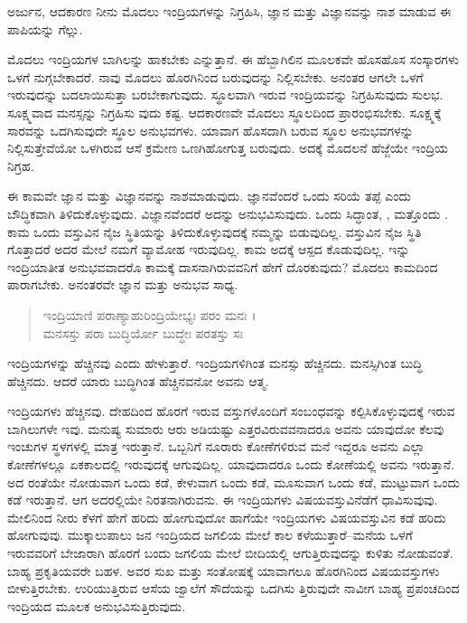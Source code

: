 {\small ಅರ್ಜುನ, ಆದಕಾರಣ ನೀನು ಮೊದಲು ಇಂದ್ರಿಯಗಳನ್ನು ನಿಗ್ರಹಿಸಿ, ಜ್ಞಾನ ಮತ್ತು ವಿಜ್ಞಾನವನ್ನು ನಾಶ ಮಾಡುವ ಈ ಪಾಪಿಯನ್ನು ಗೆಲ್ಲು.}

ಮೊದಲು ಇಂದ್ರಿಯಗಳ ಬಾಗಿಲನ್ನು ಹಾಕಬೇಕು ಎನ್ನುತ್ತಾನೆ. ಈ ಹೆಬ್ಬಾಗಿಲಿನ ಮೂಲಕವೇ ಹೊಸಹೊಸ ಸಂಸ್ಕಾರಗಳು ಒಳಗೆ ನುಗ್ಗಬೇಕಾದರೆ. ನಾವು ಮೊದಲು ಹೊರಗಿನಿಂದ ಬರುವುದನ್ನು ನಿಲ್ಲಿಸಬೇಕು. ಅನಂತರ ಆಗಲೇ ಒಳಗೆ ಇರುವುದನ್ನು ಬದಲಾಯಿಸುತ್ತಾ ಬರಬೇಕಾಗುವುದು. ಸ್ಥೂಲವಾಗಿ ಇರುವ ಇಂದ್ರಿಯವನ್ನು ನಿಗ್ರಹಿಸುವುದು ಸುಲಭ. ಸೂಕ್ಷ್ಮವಾದ ಮನಸ್ಸನ್ನು ನಿಗ್ರಹಿಸು ವುದು ಕಷ್ಟ. ಆದಕಾರಣವೇ ಮೊದಲು ಸ್ಥೂಲದಿಂದ ಪ್ರಾರಂಭಿಸಬೇಕು. ಸೂಕ್ಷ್ಮಕ್ಕೆ ಸಾರವನ್ನು ಒದಗಿಸುವುದೇ ಸ್ಥೂಲ ಅನುಭವಗಳು. ಯಾವಾಗ ಹೊಸದಾಗಿ ಬರುವ ಸ್ಥೂಲ ಅನುಭವಗಳನ್ನು ನಿಲ್ಲಿಸುತ್ತೇವೆಯೋ ಒಳಗಿರುವ ಆಸೆ ಕ್ರಮೇಣ ಒಣಗಿಹೋಗುತ್ತ ಬರುವುದು. ಅದಕ್ಕೆ ಮೊದಲನೆ ಹೆಜ್ಜೆಯೇ ಇಂದ್ರಿಯ ನಿಗ್ರಹ.

ಈ ಕಾಮವೇ ಜ್ಞಾನ ಮತ್ತು ವಿಜ್ಞಾನವನ್ನು ನಾಶಮಾಡುವುದು. ಜ್ಞಾನವೆಂದರೆ ಒಂದು ಸರಿಯೆ ತಪ್ಪೆ ಎಂದು ಬೌದ್ಧಿಕವಾಗಿ ತಿಳಿದುಕೊಳ್ಳುವುದು. ವಿಜ್ಞಾನವೆಂದರೆ ಅದನ್ನು ಅನುಭವಿಸುವುದು. ಒಂದು ಸಿದ್ಧಾಂತ, , ಮತ್ತೊಂದು . ಕಾಮ ಒಂದು ವಸ್ತುವಿನ ನೈಜ ಸ್ಥಿತಿಯನ್ನು ತಿಳಿದುಕೊಳ್ಳುವುದಕ್ಕೆ ನಮ್ಮನ್ನು ಬಿಡುವುದಿಲ್ಲ. ವಸ್ತುವಿನ ನೈಜ ಸ್ಥಿತಿ ಗೊತ್ತಾದರೆ ಅದರ ಮೇಲೆ ನಮಗೆ ವ್ಯಾಮೋಹ ಇರುವುದಿಲ್ಲ. ಕಾಮ ಅದಕ್ಕೆ ಆಸ್ಪದ ಕೊಡುವುದಿಲ್ಲ. ಇನ್ನು ಇಂದ್ರಿಯಾತೀತ ಅನುಭವವಾದರೊ ಕಾಮಕ್ಕೆ ದಾಸನಾಗಿರುವವನಿಗೆ ಹೇಗೆ ದೊರಕುವುದು? ಮೊದಲು ಕಾಮದಿಂದ ಪಾರಾಗಬೇಕು. ಅನಂತರವೇ ಜ್ಞಾನ ಮತ್ತು ಅನುಭವ ಸಾಧ್ಯ.

\begin{verse}
ಇಂದ್ರಿಯಾಣಿ ಪರಾಣ್ಯಾಹುರಿಂದ್ರಿಯೇಭ್ಯಃ ಪರಂ ಮನಃ ।\\ಮನಸಸ್ತು ಪರಾ ಬುದ್ಧಿರ್ಯೋ ಬುದ್ಧೇಃ ಪರತಸ್ತು ಸಃ 
\end{verse}

{\small ಇಂದ್ರಿಯಗಳನ್ನು ಹೆಚ್ಚಿನವು ಎಂದು ಹೇಳುತ್ತಾರೆ. ಇಂದ್ರಿಯಗಳಿಗಿಂತ ಮನಸ್ಸು ಹೆಚ್ಚಿನದು. ಮನಸ್ಸಿಗಿಂತ ಬುದ್ಧಿ ಹೆಚ್ಚಿನದು. ಆದರೆ ಯಾರು ಬುದ್ಧಿಗಿಂತ ಹೆಚ್ಚಿನವನೋ ಅವನು ಆತ್ಮ.}

ಇಂದ್ರಿಯಗಳು ಹೆಚ್ಚಿನವು. ದೇಹದಿಂದ ಹೊರಗೆ ಇರುವ ವಸ್ತುಗಳೊಂದಿಗೆ ಸಂಬಂಧವನ್ನು ಕಲ್ಪಿಸಿಕೊಳ್ಳುವುದಕ್ಕೆ ಇರುವ ಬಾಗಿಲುಗಳೇ ಇವು. ಮನುಷ್ಯ ಸುಮಾರು ಆರು ಅಡಿಯಷ್ಟು ಎತ್ತರವಿರುವವನಾದರೂ ಅವನು ಯಾವುದೋ ಕೆಲವು ಇಂಚುಗಳ ಸ್ಥಳಗಳಲ್ಲಿ ಮಾತ್ರ ಇರುತ್ತಾನೆ. ಒಬ್ಬನಿಗೆ ನೂರಾರು ಕೋಣೆಗಳಿರುವ ಮನೆ ಇದ್ದರೂ ಅವನು ಎಲ್ಲಾ ಕೋಣೆಗಳಲ್ಲೂ ಏಕಕಾಲದಲ್ಲಿ ಇರುವುದಕ್ಕೆ ಆಗುವುದಿಲ್ಲ. ಯಾವುದಾದರೂ ಒಂದು ಕೋಣೆಯಲ್ಲಿ ಅವನು ಇರುತ್ತಾನೆ. ಅದ ರಂತೆಯೇ ನೋಡುವಾಗ ಒಂದು ಕಡೆ, ಕೇಳುವಾಗ ಒಂದು ಕಡೆ, ಮೂಸುವಾಗ ಒಂದು ಕಡೆ, ಮುಟ್ಟುವಾಗ ಒಂದು ಕಡೆ ಇರುತ್ತಾನೆ. ಆಗ ಅದರಲ್ಲಿಯೇ ನಿರತನಾಗಿರುವನು. ಈ ಇಂದ್ರಿಯಗಳು ವಿಷಯವಸ್ತುವಿನೆಡೆಗೆ ಧಾವಿಸುವುವು. ಮೇಲಿನಿಂದ ನೀರು ಕೆಳಗೆ ಹೇಗೆ ಹರಿದು ಹೋಗುವುದೋ ಹಾಗೆಯೇ ಇಂದ್ರಿಯಗಳು ವಿಷಯವಸ್ತುವಿನ ಕಡೆ ಹರಿದು ಹೋಗುವುವು. ಮುಕ್ಕಾಲುಪಾಲು ಜನ ಇಂದ್ರಿಯದ ಜಗಲಿಯ ಮೇಲೆ ಕಾಲ ಕಳೆಯುತ್ತಾರೆ–ಮನೆಯ ಒಳಗೆ ಇರುವವರಿಗೆ ಬೇಜಾರಾಗಿ ಹೊರಗೆ ಬಂದು ಜಗಲಿಯ ಮೇಲೆ ಬೀದಿಯಲ್ಲಿ ಆಗುತ್ತಿರುವುದನ್ನು ಕುಳಿತು ನೋಡುವಂತೆ. ಬಾಹ್ಯ ಪ್ರಕೃತಿಯವರೇ ಬಹಳ. ಅವರ ಸುಖ ಮತ್ತು ಸಂತೋಷಕ್ಕೆ ಯಾವಾಗಲೂ ಹೊರಗಿನಿಂದ ವಿಷಯವಸ್ತುಗಳು ಬೀಳುತ್ತಿರಬೇಕು. ಉರಿಯುತ್ತಿರುವ ಆಸೆಯ ಜ್ವಾಲೆಗೆ ಸೌದೆಯನ್ನು ಒದಗಿಸು ತ್ತಿರುವುದೇ ನಾವೀಗ ಬಾಹ್ಯ ಪ್ರಪಂಚದಿಂದ ಇಂದ್ರಿಯದ ಮೂಲಕ ಅನುಭವಿಸುತ್ತಿರುವುದು.

